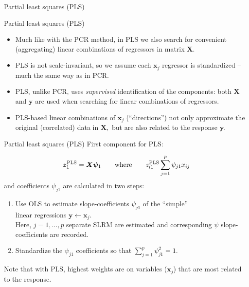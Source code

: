 \documentclass{beamer}
\begin{document}
\begin{frame}{Partial least squares (PLS)}
\end{frame}
\begin{frame}{Partial least squares (PLS)}
\begin{itemize}
\item Much like with the PCR method, in PLS we also search for convenient (aggregating) linear combinations of regressors in matrix $\bm{X}$.\\
\medskip
\item PLS is not scale-invariant, so we assume each $\bm{x}_j$ regressor is standardized -- much the same way as in PCR.\\
\medskip
\item PLS, unlike PCR, uses \textit{supervised} identification of the components: both $\bm{X}$ and $\bm{y}$ are used when searching for linear combinations of regressors.\\
\medskip
\item PLS-based linear combinations of $\bm{x}_j$ (``directions'') not only approximate the original (correlated) data in $\bm{X},$ but are also related to the response $\bm{y}$.
\end{itemize}
\end{frame}
\begin{frame}{Partial least squares (PLS)}
First component for PLS:

$$ \bm{z}_1^{\textnormal{PLS}} = \bm{X\psi}_1 \qquad \textnormal{where} \qquad 
z_{i1}^{\textnormal{PLS}} \sum_{j=1}^p \psi_{j1} x_{ij}$$
\medskip
and coefficients $\psi_{j1}$ are calculated in two steps:
\begin{enumerate}
\item Use OLS to estimate slope-coefficients $\psi_{j1}$ of the ``simple'' \\linear regressions $\bm{y} \leftarrow \bm{x}_j$.\\ \smallskip Here, $j=1,\dots,p$ separate SLRM are estimated and corresponding $\psi$ slope-coefficients are recorded.
\medskip
\item Standardize the $\psi_{j1}$ coefficients so that $\sum_{j=1}^p \psi_{j1}^2=1$.
\end{enumerate}
\bigskip
Note that with PLS, highest weights are on variables ($\bm{x}_j$) that are most related to the response. 
\end{frame}
\end{document}
